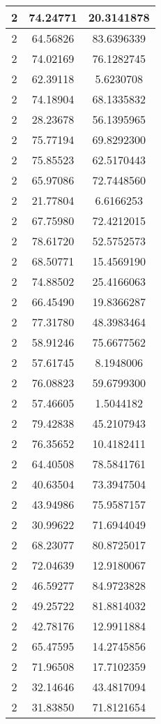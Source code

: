 \documentclass[
]{book}
\begin{document}
\begin{tabular}{c|c|c}
\hline
2 & 74.24771 & 20.3141878\\
\hline
2 & 64.56826 & 83.6396339\\
\hline
2 & 74.02169 & 76.1282745\\
\hline
2 & 62.39118 & 5.6230708\\
\hline
2 & 74.18904 & 68.1335832\\
\hline
2 & 28.23678 & 56.1395965\\
\hline
2 & 75.77194 & 69.8292300\\
\hline
2 & 75.85523 & 62.5170443\\
\hline
2 & 65.97086 & 72.7448560\\
\hline
2 & 21.77804 & 6.6166253\\
\hline
2 & 67.75980 & 72.4212015\\
\hline
2 & 78.61720 & 52.5752573\\
\hline
2 & 68.50771 & 15.4569190\\
\hline
2 & 74.88502 & 25.4166063\\
\hline
2 & 66.45490 & 19.8366287\\
\hline
2 & 77.31780 & 48.3983464\\
\hline
2 & 58.91246 & 75.6677562\\
\hline
2 & 57.61745 & 8.1948006\\
\hline
2 & 76.08823 & 59.6799300\\
\hline
2 & 57.46605 & 1.5044182\\
\hline
2 & 79.42838 & 45.2107943\\
\hline
2 & 76.35652 & 10.4182411\\
\hline
2 & 64.40508 & 78.5841761\\
\hline
2 & 40.63504 & 73.3947504\\
\hline
2 & 43.94986 & 75.9587157\\
\hline
2 & 30.99622 & 71.6944049\\
\hline
2 & 68.23077 & 80.8725017\\
\hline
2 & 72.04639 & 12.9180067\\
\hline
2 & 46.59277 & 84.9723828\\
\hline
2 & 49.25722 & 81.8814032\\
\hline
2 & 42.78176 & 12.9911884\\
\hline
2 & 65.47595 & 14.2745856\\
\hline
2 & 71.96508 & 17.7102359\\
\hline
2 & 32.14646 & 43.4817094\\
\hline
2 & 31.83850 & 71.8121654\\

\end{tabular}
\end{document}
